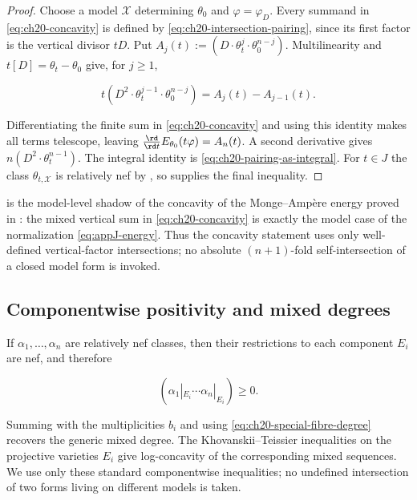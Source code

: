 \begin{proof}
Choose a model \(\mathcal X\) determining \(\theta_0\) and
\(\varphi=\varphi_D\).  Every summand in
\eqref{eq:ch20-concavity} is defined by
\eqref{eq:ch20-intersection-pairing}, since its first factor is the vertical
divisor \(tD\).  Put
\(A_j(t):=(D\cdot\theta_t^j\cdot\theta_0^{n-j})\).  Multilinearity and
\(t[D]=\theta_t-\theta_0\) give, for \(j\geq1\),

\[
 t(D^2\cdot\theta_t^{j-1}\cdot\theta_0^{n-j})
 =A_j(t)-A_{j-1}(t).
\]

Differentiating the finite sum in \eqref{eq:ch20-concavity} and using this
identity makes all terms telescope, leaving
\(\frac{\rd}{\rd t}E_{\theta_0}(t\varphi)=A_n(t)\).  A second derivative
gives \(n(D^2\cdot\theta_t^{n-1})\).  The integral identity is
\eqref{eq:ch20-pairing-as-integral}.  For \(t\in J\) the class
\(\theta_{t,\mathcal X}\) is relatively nef by
, so
 supplies the final inequality.
\end{proof}

 is the model-level shadow of the concavity of the
Monge--Amp\`ere energy proved in : the mixed vertical
sum in \eqref{eq:ch20-concavity} is exactly the model case of the
normalization \eqref{eq:appJ-energy}.  Thus the concavity statement uses only
well-defined vertical-factor intersections; no absolute
\((n+1)\)-fold self-intersection of a closed model form is invoked.

\subsection{Componentwise positivity and mixed degrees}
\label{sec:ch20-componentwise}

If \(\alpha_1,\ldots,\alpha_n\) are relatively nef classes, then their
restrictions to each component \(E_i\) are nef, and therefore

\begin{equation}
\label{eq:ch20-mixed-component-positive}
        (\alpha_1|_{E_i}\cdots\alpha_n|_{E_i})\geq0.
\end{equation}

Summing with the multiplicities \(b_i\) and using
\eqref{eq:ch20-special-fibre-degree} recovers the generic mixed degree.
The Khovanskii--Teissier inequalities on the projective varieties \(E_i\)
give log-concavity of the corresponding mixed sequences.  We use only these
standard componentwise inequalities; no undefined intersection of two forms
living on different models is taken.

